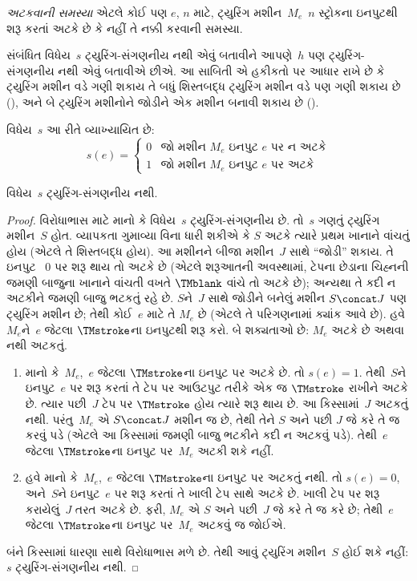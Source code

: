 \begin{defn}
\emph{અટકવાની સમસ્યા} એટલે કોઈ પણ $e$, $n$ માટે,
ટ્યુરિંગ મશીન~$M_e$~$n$ સ્ટ્રોકના
ઇનપુટથી શરૂ કરતાં અટકે છે કે નહીં તે નક્કી કરવાની
સમસ્યા.
\end{defn}

\begin{explain}
સંબંધિત વિધેય~$s$ ટ્યુરિંગ-સંગણનીય નથી એવું બતાવીને
આપણે~$h$ પણ ટ્યુરિંગ-સંગણનીય નથી એવું બતાવીએ છીએ.
આ સાબિતી એ હકીકતો પર આધાર રાખે છે કે ટ્યુરિંગ મશીન
વડે ગણી શકાય તે બધું શિસ્તબદ્ધ ટ્યુરિંગ મશીન વડે પણ
ગણી શકાય છે (), અને બે ટ્યુરિંગ
મશીનોને જોડીને એક મશીન બનાવી શકાય છે
().
\end{explain}

\begin{defn} વિધેય~$s$ આ રીતે વ્યાખ્યાયિત છે:
\[
s(e) =
\begin{cases}
  \text{0} & \text{જો મશીન~$M_e$ ઇનપુટ $e$ પર ન અટકે} \\
  \text{1} & \text{જો મશીન~$M_e$ ઇનપુટ $e$ પર અટકે}
\end{cases}
\]
\end{defn}

\begin{lem}
વિધેય~$s$ ટ્યુરિંગ-સંગણનીય નથી.
\end{lem}

\begin{proof}
વિરોધાભાસ માટે માનો કે વિધેય~$s$ ટ્યુરિંગ-સંગણનીય
છે. તો~$s$ ગણતું ટ્યુરિંગ મશીન~$S$ હોત. વ્યાપકતા
ગુમાવ્યા વિના ધારી શકીએ કે $S$ અટકે ત્યારે પ્રથમ
ખાનાને વાંચતું હોય (એટલે તે શિસ્તબદ્ધ હોય). આ
મશીનને બીજા મશીન~$J$ સાથે ``જોડી'' શકાય. તે ઇનપુટ
~$0$ પર શરૂ થાય તો અટકે છે (એટલે શરૂઆતની અવસ્થામાં,
ટેપના છેડાના ચિહ્નની જમણી બાજુના ખાનાને વાંચતી વખતે
$\TMblank$ વાંચે તો અટકે છે); અન્યથા તે કદી ન અટકીને
જમણી બાજુ ભટકતું રહે છે. $S$ને~$J$ સાથે જોડીને
બનેલું મશીન $S \concat J$ પણ ટ્યુરિંગ મશીન છે;
તેથી કોઈ~$e$ માટે તે $M_e$ છે (એટલે તે પરિગણનામાં
ક્યાંક આવે છે). હવે~$M_e$ને~$e$ જેટલા $\TMstroke$ના
ઇનપુટથી શરૂ કરો. બે શક્યતાઓ છે: $M_e$ અટકે છે
અથવા નથી અટકતું.
\begin{enumerate}
\item માનો કે~$M_e$,~$e$ જેટલા $\TMstroke$ના ઇનપુટ
  પર અટકે છે. તો $s(e) = 1$. તેથી~$S$ને ઇનપુટ~$e$
  પર શરૂ કરતાં તે ટેપ પર આઉટપુટ તરીકે એક જ
  $\TMstroke$ રાખીને અટકે છે. ત્યાર પછી~$J$ ટેપ પર
  $\TMstroke$ હોય ત્યારે શરૂ થાય છે. આ કિસ્સામાં~$J$
  અટકતું નથી. પરંતુ~$M_e$ એ $S \concat J$ મશીન જ
  છે, તેથી તેને $S$ અને પછી $J$ જે કરે તે જ કરવું
  પડે (એટલે આ કિસ્સામાં જમણી બાજુ ભટકીને કદી ન
  અટકવું પડે). તેથી~$e$ જેટલા $\TMstroke$ના ઇનપુટ
  પર~$M_e$ અટકી શકે નહીં.

\item હવે માનો કે~$M_e$,~$e$ જેટલા $\TMstroke$ના
  ઇનપુટ પર અટકતું નથી. તો $s(e) = 0$, અને~$S$ને
  ઇનપુટ~$e$ પર શરૂ કરતાં તે ખાલી ટેપ સાથે અટકે છે.
  ખાલી ટેપ પર શરૂ કરાયેલું~$J$ તરત અટકે છે. ફરી,
  $M_e$ એ $S$ અને પછી~$J$ જે કરે તે જ કરે છે;
  તેથી~$e$ જેટલા $\TMstroke$ના ઇનપુટ પર~$M_e$
  અટકવું જ જોઈએ.
\end{enumerate}
બંને કિસ્સામાં ધારણા સાથે વિરોધાભાસ મળે છે. તેથી
આવું ટ્યુરિંગ મશીન~$S$ હોઈ શકે નહીં: $s$ ટ્યુરિંગ-સંગણનીય
નથી.
\end{proof}

